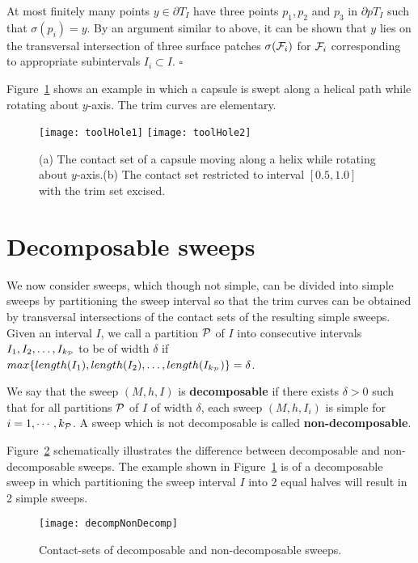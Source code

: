 \documentclass{elsart5p}
\begin{document}
 At most finitely many points $y \in \partial T_I$ have three points $p_1, p_2$ and $p_3$ in $\partial pT_I$ such 
that $\sigma(p_i) = y$.  By an argument similar to above, it can be shown that $y$ lies on the transversal 
intersection of three surface patches $\sigma({\cal F}_i)$ for ${\cal F}_i$ corresponding to appropriate 
subintervals $I_i \subset I$.
\hfill $\square$


Figure~\ref{toolFig} shows an example in which a capsule is swept along a helical path while rotating about 
$y$-axis.  The trim curves are elementary.


\begin{figure}
 \centering
 \texttt{[image: toolHole1]}
 \texttt{[image: toolHole2]}
 \caption{(a) The contact set of a capsule moving along a helix while rotating 
about $y$-axis.(b) The contact set restricted to interval $[0.5,1.0]$ with the trim set excised.}
 \label{toolFig}
\end{figure}

\section{Decomposable sweeps} \label{decompSec}

We now consider sweeps, which though not simple, can be divided into simple sweeps by 
partitioning the sweep interval so that the trim curves can be obtained by transversal intersections 
of the contact sets of the resulting simple sweeps.
Given an interval $I$, we call a partition ${\cal P}$ of $I$ 
into consecutive intervals $I_1, I_2, \ldots, I_{k_{\cal P}}$ to be of width $\delta$ if $max\{ length(I_1), length(I_2), \ldots, length(I_{k_{\cal P}}) \} = \delta$.
\begin{defn} \label{decompDef}
We say that the sweep $(M,h, I)$ is {\bf decomposable}
if there exists $\delta > 0$ such that for all partitions ${\cal P}$ of $I$ of width $\delta$, 
each sweep $(M,h,I_i )$ is simple for  $i= 1, \cdots, k_{\cal P}$. A sweep
which is not decomposable is called {\bf non-decomposable}.
\end{defn}
Figure~\ref{decompNonDecompFig} schematically illustrates the difference between decomposable 
and non-decomposable sweeps.  The example shown in Figure~\ref{toolFig} is of a decomposable sweep 
in which partitioning the sweep interval $I$ into 2 equal halves will result in 2 simple sweeps. 
\begin{figure}
 \centering
 \texttt{[image: decompNonDecomp]}
 \caption{Contact-sets of decomposable and non-decomposable sweeps.}
 \label{decompNonDecompFig}
\end{figure}
\end{document}

